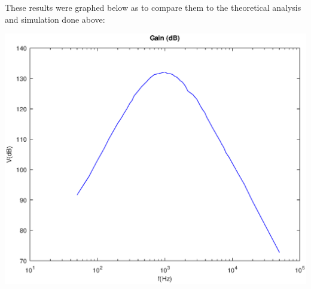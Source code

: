 \begin{table}
\begin{tabular}{|c|c|c|c|}
    \hline
    \end{tabular}
    \label{tab:fvl}
\end{table}

    These results were graphed below as to compare them to the theoretical analysis and simulation done above:

    \includegraphics[width=1\linewidth]{lab.eps}